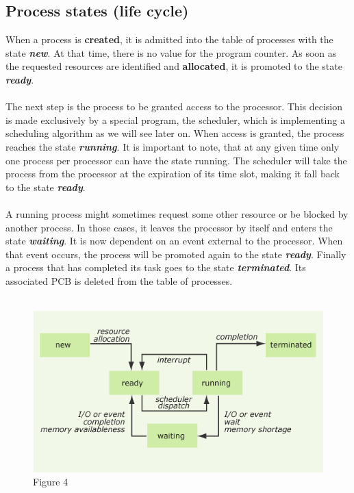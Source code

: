 \documentclass[11pt,a4paper]{scrreprt}
\begin{document}
\subsection{Process states (life cycle)}
When a process is \textbf{created}, it is admitted into the table of processes with the state \textbf{\textit{new}}. At that time, there is no value for the program counter. As soon as the requested resources are identified and \textbf{allocated}, it is promoted to the state \textbf{\textit{ready}}.\\\\
The next step is the process to be granted access to the processor. This decision is made exclusively by a special program, the scheduler, which is implementing a scheduling algorithm as we will see later on. When access is granted, the process reaches the state \textbf{\textit{running}}. It is important to note, that at any given time only one process per processor can have the state running. The scheduler will take the process from the processor at the expiration of its time slot, making it fall back to the state \textbf{\textit{ready}}.\\\\
A running process might sometimes request some other resource or be blocked by another process. In those cases, it leaves the processor by itself and enters the state \textbf{\textit{waiting}}. It is now dependent on an event external to the processor. When that event occurs, the process will be promoted again to the state \textbf{\textit{ready}}. Finally a process that has completed its task goes to the state \textbf{\textit{terminated}}. Its associated PCB is deleted from the table of processes. \\\\
\begin{figure}[!ht]
\centering
\includegraphics[width=0.8\linewidth]{img/states.png}
\caption{Figure 4}
\label{fig:figure4}
\end{figure}
\end{document}
